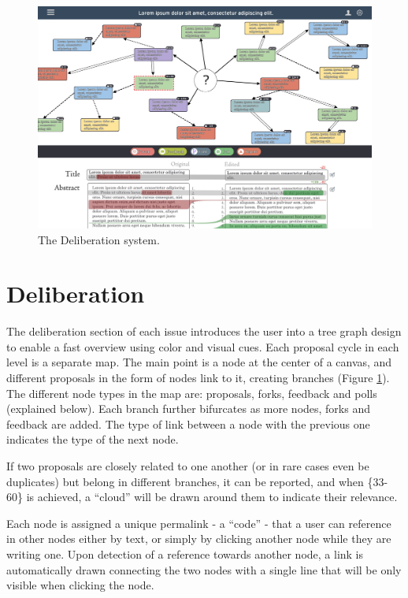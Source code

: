 \documentclass[a4paper,11pt]{article}
\begin{document}
\begin{multicols}{2}
\begin{figure}[th]
 \centering
 \includegraphics[width=140mm]{FigureB.jpg}
 \caption{The Deliberation system.}
 \label{figure2}
\end{figure}

\section{Deliberation} \label{deliberation}

The deliberation section of each issue introduces the user into a tree graph design to enable a fast overview using color and visual cues. Each proposal cycle in each level is a separate map. The main point is a node at the center of a canvas, and different proposals in the form of nodes link to it, creating branches (Figure \ref{figure2}). The different node types in the map are: proposals, forks, feedback and polls (explained below). Each branch further bifurcates as more nodes, forks and feedback are added. The type of link between a node with the previous one indicates the type of the next node.

If two proposals are closely related to one another (or in rare cases even be duplicates) but belong in different branches, it can be reported, and when \{33-60\} is achieved, a “cloud” will be drawn around them to indicate their relevance.

Each node is assigned a unique permalink - a “code” - that a user can reference in other nodes either by text, or simply by clicking another node while they are writing one. Upon detection of a reference towards another node, a link is automatically drawn connecting the two nodes with a single line that will be only visible when clicking the node.


\end{multicols}
\end{document}
